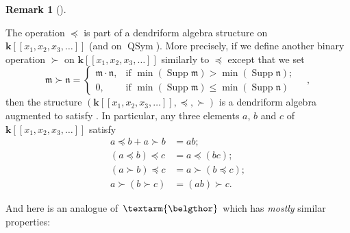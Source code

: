 \documentclass[numbers=enddot,12pt,final,onecolumn,notitlepage,abstracton]{scrartcl}%
\theoremstyle{definition}
\newtheorem{remk}[theo]{Remark}
\newenvironment{remark}[1][]
{\begin{remk}[#1]\begin{leftbar}}
{\end{leftbar}\end{remk}}
\newenvironment{verlong}{}{}
\newcommand{\bel}{\left. \textarm{\belgthor} \right.}
\begin{document}
\begin{verlong}
\begin{remark}
The operation $\left.  \preceq\right.  $ is part of a dendriform algebra
structure on $\mathbf{k}\left[  \left[  x_{1},x_{2},x_{3},\ldots\right]
\right]  $ (and on $\operatorname*{QSym}$). More precisely, if we define
another binary operation $\left.  \succ\right.  $ on $\mathbf{k}\left[
\left[  x_{1},x_{2},x_{3},\ldots\right]  \right]  $ similarly to $\left.
\preceq\right.  $ except that we set%
\[
\mathfrak{m}\left.  \succ\right.  \mathfrak{n}=
\begin{cases}
\mathfrak{m}\cdot\mathfrak{n}, & \text{if }\min\left(  \operatorname*{Supp}%
\mathfrak{m}\right)  >\min\left(  \operatorname*{Supp}\mathfrak{n}\right)  ;\\
0, & \text{if }\min\left(  \operatorname*{Supp}\mathfrak{m}\right)  \leq
\min\left(  \operatorname*{Supp}\mathfrak{n}\right)
\end{cases}
\quad,
\]
then the structure $\left(  \mathbf{k}\left[  \left[  x_{1},x_{2},x_{3}%
,\ldots\right]  \right]  ,\left.  \preceq\right.  ,\left.  \succ\right.
\right)  $ is a dendriform algebra augmented to satisfy \cite[(15)]{EbrFar08}.
In particular, any three elements $a$, $b$ and $c$ of $\mathbf{k}\left[
\left[  x_{1},x_{2},x_{3},\ldots\right]  \right]  $ satisfy%
\begin{align*}
a\left.  \preceq\right.  b+a\left.  \succ\right.  b  &  =ab;\\
\left(  a\left.  \preceq\right.  b\right)  \left.  \preceq\right.  c  &
=a\left.  \preceq\right.  \left(  bc\right)  ;\\
\left(  a\left.  \succ\right.  b\right)  \left.  \preceq\right.  c  &
=a\left.  \succ\right.  \left(  b\left.  \preceq\right.  c\right)  ;\\
a\left.  \succ\right.  \left(  b\left.  \succ\right.  c\right)   &  =\left(
ab\right)  \left.  \succ\right.  c.
\end{align*}

\end{remark}

And here is an analogue of $\bel $ which has \textit{mostly} similar properties:


\end{verlong}
\end{document}
